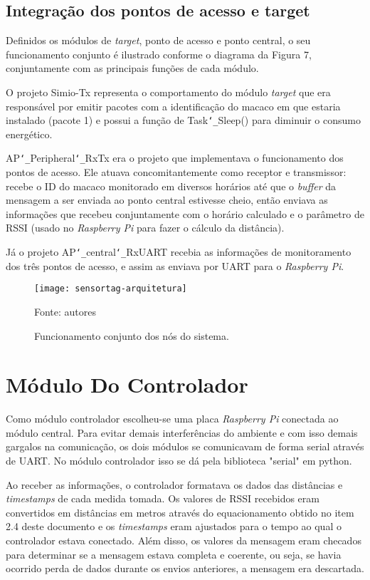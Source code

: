 \subsection{Integração dos pontos de acesso e target}

Definidos os módulos de \emph{target}, ponto de acesso e ponto central, o seu funcionamento conjunto é ilustrado conforme o diagrama da Figura 7, conjuntamente com as principais funções de cada módulo.

O projeto Simio-Tx representa o comportamento do módulo \emph{target} que era responsável por emitir pacotes com a identificação do macaco em que estaria instalado (pacote 1) e possui a função de Task\texttt{\char`\_}Sleep() para diminuir o consumo energético.

AP\texttt{\char`\_}Peripheral\texttt{\char`\_}RxTx era o projeto que implementava o funcionamento dos pontos de acesso. Ele atuava concomitantemente como receptor e transmissor: recebe o ID do macaco monitorado em diversos horários até que o \emph{buffer} da mensagem a ser enviada ao ponto central estivesse cheio, então enviava as informações que recebeu conjuntamente com o horário calculado e o parâmetro de RSSI (usado no \emph{Raspberry Pi} para fazer o cálculo da distância).

Já o projeto AP\texttt{\char`\_}central\texttt{\char`\_}RxUART recebia as informações de monitoramento dos três pontos de acesso, e assim as enviava por UART para o \emph{Raspberry Pi}.

\begin{figure}[ht]
  \centering
    \caption{ Funcionamento conjunto dos nós do sistema.}
    \texttt{[image: sensortag-arquitetura]}
  \centerline{\small{Fonte: autores}}
\end{figure}
\FloatBarrier

\section{Módulo Do Controlador}

Como módulo controlador escolheu-se uma placa \emph{Raspberry Pi} conectada ao módulo central. Para evitar demais interferências do ambiente e com isso demais gargalos na comunicação, os dois módulos se comunicavam de forma serial através de UART. No módulo controlador isso se dá pela biblioteca "serial" em python.

Ao receber as informações, o controlador formatava os dados das distâncias e \emph{timestamps} de cada medida tomada. Os valores de RSSI recebidos eram convertidos em distâncias em metros através do equacionamento obtido no item 2.4 deste documento e os \emph{timestamps} eram ajustados para o tempo ao qual o controlador estava conectado. Além disso, os valores da mensagem eram checados para determinar se a mensagem estava completa e coerente, ou seja, se havia ocorrido perda de dados durante os envios anteriores, a mensagem era descartada.

